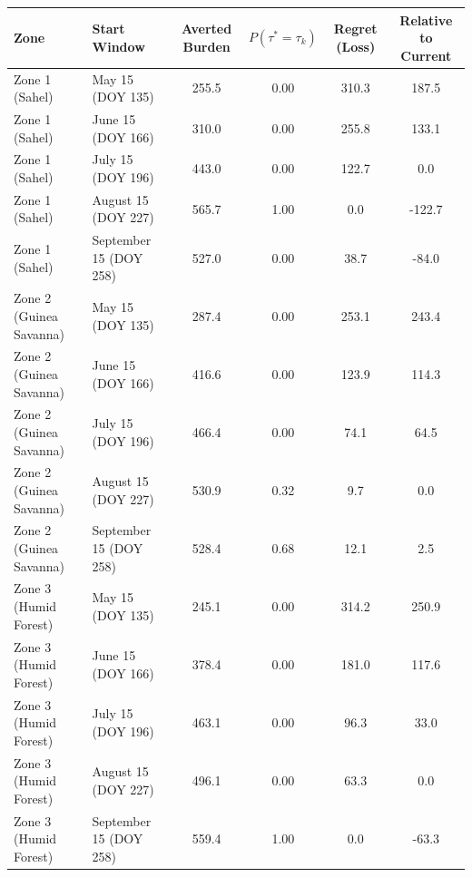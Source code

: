 \begin{tabular}{llcccc}
\hline
Zone & Start Window & Averted Burden & $P(\tau^* = \tau_k)$ & Regret (Loss) & Relative to Current \\
\hline
Zone 1 (Sahel) & May 15 (DOY 135) & 255.5 & 0.00 & 310.3 & 187.5 \\
Zone 1 (Sahel) & June 15 (DOY 166) & 310.0 & 0.00 & 255.8 & 133.1 \\
Zone 1 (Sahel) & July 15 (DOY 196) & 443.0 & 0.00 & 122.7 & 0.0 \\
Zone 1 (Sahel) & August 15 (DOY 227) & 565.7 & 1.00 & 0.0 & -122.7 \\
Zone 1 (Sahel) & September 15 (DOY 258) & 527.0 & 0.00 & 38.7 & -84.0 \\
Zone 2 (Guinea Savanna) & May 15 (DOY 135) & 287.4 & 0.00 & 253.1 & 243.4 \\
Zone 2 (Guinea Savanna) & June 15 (DOY 166) & 416.6 & 0.00 & 123.9 & 114.3 \\
Zone 2 (Guinea Savanna) & July 15 (DOY 196) & 466.4 & 0.00 & 74.1 & 64.5 \\
Zone 2 (Guinea Savanna) & August 15 (DOY 227) & 530.9 & 0.32 & 9.7 & 0.0 \\
Zone 2 (Guinea Savanna) & September 15 (DOY 258) & 528.4 & 0.68 & 12.1 & 2.5 \\
Zone 3 (Humid Forest) & May 15 (DOY 135) & 245.1 & 0.00 & 314.2 & 250.9 \\
Zone 3 (Humid Forest) & June 15 (DOY 166) & 378.4 & 0.00 & 181.0 & 117.6 \\
Zone 3 (Humid Forest) & July 15 (DOY 196) & 463.1 & 0.00 & 96.3 & 33.0 \\
Zone 3 (Humid Forest) & August 15 (DOY 227) & 496.1 & 0.00 & 63.3 & 0.0 \\
Zone 3 (Humid Forest) & September 15 (DOY 258) & 559.4 & 1.00 & 0.0 & -63.3 \\
\hline
\end{tabular}
